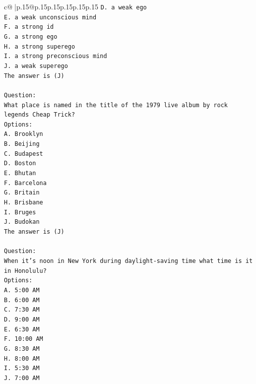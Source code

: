 \documentclass{article}
\begin{document}
{\begin{supertabular}{c@{$\;$}|p{.15\linewidth}@{}p{.15\linewidth}p{.15\linewidth}p{.15\linewidth}p{.15\linewidth}p{.15\linewidth}}
{{{\texttt{D. a weak ego} \\
\texttt{E. a weak unconscious mind} \\
\texttt{F. a strong id} \\
\texttt{G. a strong ego} \\
\texttt{H. a strong superego} \\
\texttt{I. a strong preconscious mind} \\
\texttt{J. a weak superego} \\
\texttt{The answer is (J)} \\
\\ 
\texttt{Question:} \\
\texttt{What place is named in the title of the 1979 live album by rock legends Cheap Trick?} \\
\texttt{Options:} \\
\texttt{A. Brooklyn} \\
\texttt{B. Beijing} \\
\texttt{C. Budapest} \\
\texttt{D. Boston} \\
\texttt{E. Bhutan} \\
\texttt{F. Barcelona} \\
\texttt{G. Britain} \\
\texttt{H. Brisbane} \\
\texttt{I. Bruges} \\
\texttt{J. Budokan} \\
\texttt{The answer is (J)} \\
\\ 
\texttt{Question:} \\
\texttt{When it's noon in New York during daylight{-}saving time what time is it in Honolulu?} \\
\texttt{Options:} \\
\texttt{A. 5:00 AM} \\
\texttt{B. 6:00 AM} \\
\texttt{C. 7:30 AM} \\
\texttt{D. 9:00 AM} \\
\texttt{E. 6:30 AM} \\
\texttt{F. 10:00 AM} \\
\texttt{G. 8:30 AM} \\
\texttt{H. 8:00 AM} \\
\texttt{I. 5:30 AM} \\
\texttt{J. 7:00 AM} \\
            }
        }
    }
     \\ \\


\end{supertabular}}
\end{document}
